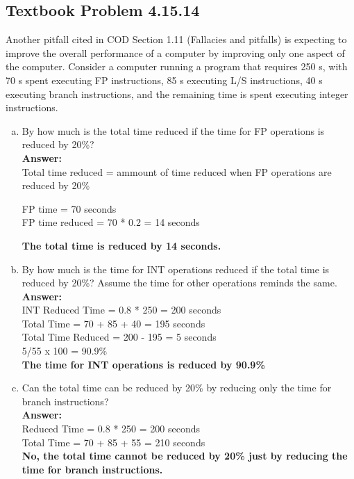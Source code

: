 \documentclass[12pt]{article}
\begin{document}
\subsection{Textbook Problem 4.15.14}
Another pitfall cited in COD Section 1.11 (Fallacies and pitfalls) is expecting to improve the overall performance of a computer by improving only one aspect of the computer. Consider a computer running a program that requires 250 s, with 70 s spent executing FP instructions, 85 s executing L/S instructions, 40 s executing branch instructions, and the remaining time is spent executing integer instructions.
\begin{enumerate}[(a)]
    \item By how much is the total time reduced if the time for FP operations is reduced by 20\%?
    \\
    \textbf{Answer:}
    \\
    Total time reduced = ammount of time reduced when FP operations are reduced by 20\%
    \begin{center}
        FP time = 70 seconds\\
        FP time reduced = 70 * 0.2 = 14 seconds\\
    \end{center}
    \textbf{The total time is reduced by 14 seconds.}
    
    \item By how much is the time for INT operations reduced if the total time is reduced by 20\%? Assume the time for other operations reminds the same.
    \\
    \textbf{Answer:}
    \\
    INT Reduced Time = 0.8 * 250 = 200 seconds\\
    Total Time = 70 + 85 + 40 = 195 seconds\\
    Total Time Reduced = 200 - 195 = 5 seconds\\
    5/55 x 100 = 90.9\%\\[0.25in]
    \textbf{The time for INT operations is reduced by 90.9\%}
    
    \item Can the total time can be reduced by 20\% by reducing only the time for branch instructions?
    \\
    \textbf{Answer:}
    \\
    Reduced Time = 0.8 * 250 = 200 seconds\\
    Total Time = 70 + 85 + 55 = 210 seconds\\[0.25in]
    \textbf{No, the total time cannot be reduced by 20\% just by reducing the time for branch instructions.}

\end{enumerate}
\end{document}
